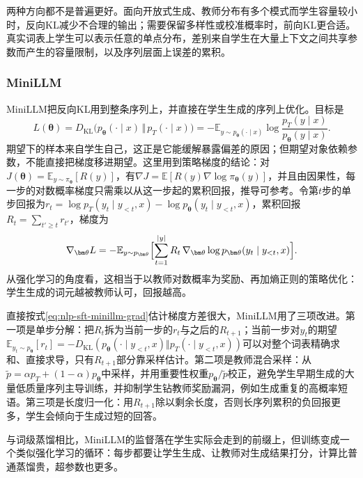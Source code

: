 两种方向都不是普遍更好。面向开放式生成、教师分布有多个模式而学生容量较小时，反向KL减少不合理的输出；需要保留多样性或校准概率时，前向KL更合适。真实词表上学生可以表示任意的单点分布，差别来自学生在大量上下文之间共享参数而产生的容量限制，以及序列层面上误差的累积。

\subsubsection{MiniLLM}
\label{sec:nlp-sft-minillm}

MiniLLM把反向KL用到整条序列上，并直接在学生生成的序列上优化。目标是
\[
 L(\bm\theta)=D_{\mathrm{KL}}\bigl(p_{\bm\theta}(\cdot\mid x)\,\Vert\,p_T(\cdot\mid x)\bigr)
 =-\mathbb E_{y\sim p_{\bm\theta}(\cdot\mid x)}\log\frac{p_T(y\mid x)}{p_{\bm\theta}(y\mid x)}.
\]
期望下的样本来自学生自己，这正是它能缓解暴露偏差的原因；但期望对象依赖参数，不能直接把梯度移进期望。这里用到策略梯度的结论：对$J(\bm\theta)=\mathbb E_{y\sim\pi_{\bm\theta}}[R(y)]$，有$\nabla J=\mathbb E[R(y)\nabla\log\pi_{\bm\theta}(y)]$，并且由因果性，每一步的对数概率梯度只需乘以从这一步起的累积回报，推导可参考。令第$t$步的单步回报为$r_t=\log p_T(y_t\mid y_{<t},x)-\log p_{\bm\theta}(y_t\mid y_{<t},x)$，累积回报$R_t=\sum_{t'\geq t}r_{t'}$，梯度为
\begin{equation}
 \nabla_{\bm\theta}L=-\mathbb E_{y\sim p_{\bm\theta}}\Bigl[\sum_{t=1}^{\lvert y\rvert}R_t\,\nabla_{\bm\theta}\log p_{\bm\theta}(y_t\mid y_{<t},x)\Bigr].
 \label{eq:nlp-sft-minillm-grad}
\end{equation}
从强化学习的角度看，这相当于以教师对数概率为奖励、再加熵正则的策略优化：学生生成的词元越被教师认可，回报越高。

直接按式\eqref{eq:nlp-sft-minillm-grad}估计梯度方差很大，MiniLLM用了三项改进。第一项是单步分解：把$R_t$拆为当前一步的$r_t$与之后的$R_{t+1}$；当前一步对$y_t$的期望$\mathbb E_{y_t\sim p_{\bm\theta}}[r_t]=-D_{\mathrm{KL}}(p_{\bm\theta}(\cdot\mid y_{<t},x)\Vert p_T(\cdot\mid y_{<t},x))$可以对整个词表精确求和、直接求导，只有$R_{t+1}$部分靠采样估计。第二项是教师混合采样：从$\tilde p=\alpha p_T+(1-\alpha)p_{\bm\theta}$中采样，并用重要性权重$p_{\bm\theta}/\tilde p$校正，避免学生早期生成的大量低质量序列主导训练，并抑制学生钻教师奖励漏洞，例如生成重复的高概率短语。第三项是长度归一化：用$R_{t+1}$除以剩余长度，否则长序列累积的负回报更多，学生会倾向于生成过短的回答。

与词级蒸馏相比，MiniLLM的监督落在学生实际会走到的前缀上，但训练变成一个类似强化学习的循环：每步都要让学生生成、让教师对生成结果打分，计算比普通蒸馏贵，超参数也更多。

